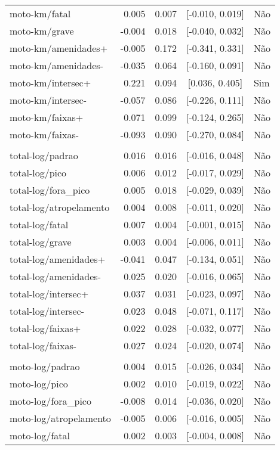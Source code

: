 \begin{longtable}{lrrcl}
moto-km/fatal & 0.005 & 0.007 & {}[-0.010, 0.019] & Não\\
moto-km/grave & -0.004 & 0.018 & {}[-0.040, 0.032] & Não\\
moto-km/amenidades+ & -0.005 & 0.172 & {}[-0.341, 0.331] & Não\\
moto-km/amenidades- & -0.035 & 0.064 & {}[-0.160, 0.091] & Não\\
moto-km/intersec+ & 0.221 & 0.094 & {}[0.036, 0.405] & Sim\\
moto-km/intersec- & -0.057 & 0.086 & {}[-0.226, 0.111] & Não\\
moto-km/faixas+ & 0.071 & 0.099 & {}[-0.124, 0.265] & Não\\
moto-km/faixas- & -0.093 & 0.090 & {}[-0.270, 0.084] & Não\\
 &  &  &  & \\
total-log/padrao & 0.016 & 0.016 & {}[-0.016, 0.048] & Não\\
total-log/pico & 0.006 & 0.012 & {}[-0.017, 0.029] & Não\\
total-log/fora\_pico & 0.005 & 0.018 & {}[-0.029, 0.039] & Não\\
total-log/atropelamento & 0.004 & 0.008 & {}[-0.011, 0.020] & Não\\
total-log/fatal & 0.007 & 0.004 & {}[-0.001, 0.015] & Não\\
total-log/grave & 0.003 & 0.004 & {}[-0.006, 0.011] & Não\\
total-log/amenidades+ & -0.041 & 0.047 & {}[-0.134, 0.051] & Não\\
total-log/amenidades- & 0.025 & 0.020 & {}[-0.016, 0.065] & Não\\
total-log/intersec+ & 0.037 & 0.031 & {}[-0.023, 0.097] & Não\\
total-log/intersec- & 0.023 & 0.048 & {}[-0.071, 0.117] & Não\\
total-log/faixas+ & 0.022 & 0.028 & {}[-0.032, 0.077] & Não\\
total-log/faixas- & 0.027 & 0.024 & {}[-0.020, 0.074] & Não\\
 &  &  &  & \\
moto-log/padrao & 0.004 & 0.015 & {}[-0.026, 0.034] & Não\\
moto-log/pico & 0.002 & 0.010 & {}[-0.019, 0.022] & Não\\
moto-log/fora\_pico & -0.008 & 0.014 & {}[-0.036, 0.020] & Não\\
moto-log/atropelamento & -0.005 & 0.006 & {}[-0.016, 0.005] & Não\\
moto-log/fatal & 0.002 & 0.003 & {}[-0.004, 0.008] & Não\\

\end{longtable}
